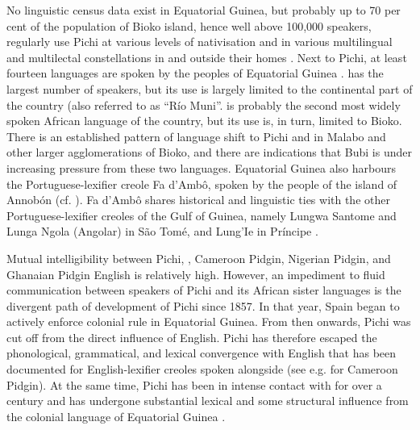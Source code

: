 No linguistic census data exist in Equatorial Guinea, but probably up to 70 per cent of the population of Bioko island, hence well above 100,000 speakers, regularly use Pichi at various levels of nativisation and in various multilingual and multilectal constellations in and outside their homes \citep[194]{Yakpo2013}. Next to Pichi, at least fourteen languages are spoken by the peoples of Equatorial Guinea \citep{Hammarstrom2017}.  has the largest number of speakers, but its use is largely limited to the continental part of the country (also referred to as “Río Muni”\textstyleannotationreference{)}.  is probably the second most widely spoken African language of the country, but its use is, in turn, limited to Bioko. There is an established pattern of language shift to Pichi and  in Malabo and other larger agglomerations of Bioko, and there are indications that Bubi is under increasing pressure from these two languages. Equatorial Guinea also harbours the Portuguese-lexifier creole Fa d’Ambô, spoken by the people of the island of Annobón (cf. ). Fa d’Ambô shares historical and linguistic ties with the other Portuguese-lexifier creoles of the Gulf of Guinea, namely Lungwa Santome and Lunga Ngola (Angolar) in São Tomé, and Lung’Ie in Príncipe \citep{Post2013}. 

Mutual intelligibility between Pichi, , Cameroon Pidgin, Nigerian Pidgin, and Ghanaian Pidgin English is relatively high. However, an impediment to fluid communication between speakers of Pichi and its African sister languages is the divergent path of development of Pichi since 1857. In that year, Spain began to actively enforce colonial rule in Equatorial Guinea. From then onwards, Pichi was cut off from the direct influence of English. Pichi has therefore escaped the phonological, grammatical, and lexical convergence with English that has been documented for English-lexifier creoles spoken alongside  (see e.g. \citealt{SalaNgefac2006} for Cameroon Pidgin). At the same time, Pichi has been in intense contact with  for over a century and has undergone substantial lexical and some structural influence from the colonial language of Equatorial Guinea . 

